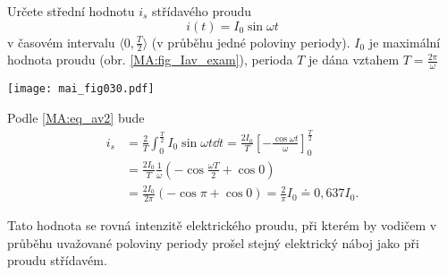 \wikitextrule
\begin{example}\label{MAI:exam032}
Určete střední hodnotu $i_s$ střídavého proudu $$i(t) = I_0\sin\omega t$$ v
    časovém intervalu $\langle 0, \frac{T}{2}\rangle$ (v průběhu jedné poloviny periody). $I_0$ je
    maximální hodnota proudu (obr. \ref{MA:fig_Iav_exam}), perioda $T$ je dána vztahem $T =
    \frac{2\pi}{\omega}$
  
  {\centering
   \captionsetup{type=figure}
   \texttt{[image: mai\_fig030.pdf]}
  \par}

    Podle \ref{MA:eq_av2} bude
    \begin{align*}
     i_s &=  \frac{2}{T}
             \int_0^{\frac{T}{2}}I_0\sin\omega t\dd{t} =
             \frac{2I_0}{T}\left[-\frac{\cos\omega t}{\omega}\right]_0^{\frac{T}{2}}        \\
         &=  \frac{2I_0}{T}\frac{1}{\omega}\left(-\cos\frac{\omega T}{2}+ \cos 0\right)     \\
         &=  \frac{2I_0}{2\pi}(-\cos\pi + \cos 0) = \frac{2}{\pi}I_0 \doteq 0,637 I_0.
  \end{align*}

  Tato hodnota se rovná intenzitě elektrického proudu, při kterém by vodičem v průběhu uvažované
  poloviny periody prošel stejný elektrický náboj jako při proudu střídavém.
\end{example}















